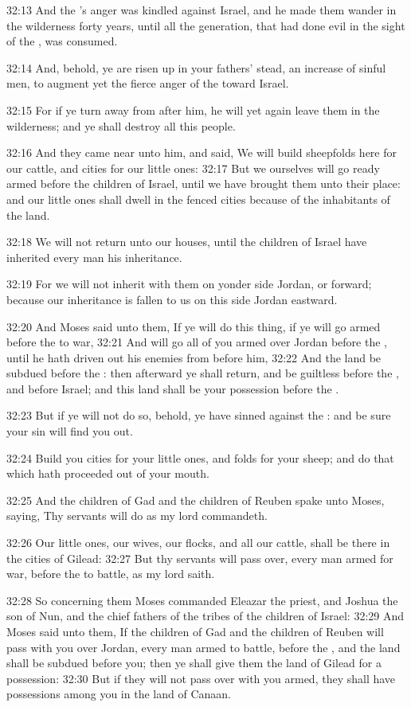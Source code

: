 32:13 And the \LORD's anger was kindled against Israel, and he made
them wander in the wilderness forty years, until all the generation,
that had done evil in the sight of the \LORD, was consumed.

32:14 And, behold, ye are risen up in your fathers' stead, an increase
of sinful men, to augment yet the fierce anger of the \LORD toward
Israel.

32:15 For if ye turn away from after him, he will yet again leave them
in the wilderness; and ye shall destroy all this people.

32:16 And they came near unto him, and said, We will build sheepfolds
here for our cattle, and cities for our little ones: 32:17 But we
ourselves will go ready armed before the children of Israel, until we
have brought them unto their place: and our little ones shall dwell in
the fenced cities because of the inhabitants of the land.

32:18 We will not return unto our houses, until the children of Israel
have inherited every man his inheritance.

32:19 For we will not inherit with them on yonder side Jordan, or
forward; because our inheritance is fallen to us on this side Jordan
eastward.

32:20 And Moses said unto them, If ye will do this thing, if ye will
go armed before the \LORD to war, 32:21 And will go all of you armed
over Jordan before the \LORD, until he hath driven out his enemies from
before him, 32:22 And the land be subdued before the \LORD: then
afterward ye shall return, and be guiltless before the \LORD, and
before Israel; and this land shall be your possession before the \LORD.

32:23 But if ye will not do so, behold, ye have sinned against the
\LORD: and be sure your sin will find you out.

32:24 Build you cities for your little ones, and folds for your sheep;
and do that which hath proceeded out of your mouth.

32:25 And the children of Gad and the children of Reuben spake unto
Moses, saying, Thy servants will do as my lord commandeth.

32:26 Our little ones, our wives, our flocks, and all our cattle,
shall be there in the cities of Gilead: 32:27 But thy servants will
pass over, every man armed for war, before the \LORD to battle, as my
lord saith.

32:28 So concerning them Moses commanded Eleazar the priest, and
Joshua the son of Nun, and the chief fathers of the tribes of the
children of Israel: 32:29 And Moses said unto them, If the children of
Gad and the children of Reuben will pass with you over Jordan, every
man armed to battle, before the \LORD, and the land shall be subdued
before you; then ye shall give them the land of Gilead for a
possession: 32:30 But if they will not pass over with you armed, they
shall have possessions among you in the land of Canaan.

